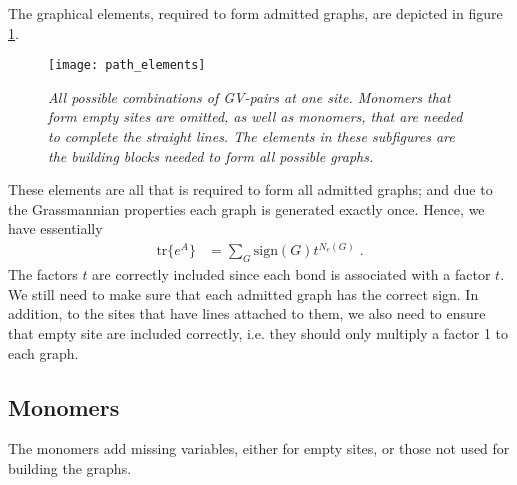 The graphical elements, required to form admitted graphs, are depicted in 
figure \ref{fig:combinations}.
%
\begin{figure}[h]
\begin{center}
\texttt{[image: path\_elements]}
\caption{{\it All possible combinations of GV-pairs at one site. Monomers that form empty sites are omitted, as well as monomers, that are needed to complete the straight lines. The elements in these subfigures are the building blocks needed   to form all possible graphs.}\label{fig:combinations}}
\end{center}
\end{figure}
%
These elements are all that is required to form all admitted graphs; and due to the 
Grassmannian properties each graph is generated exactly once. Hence, we have essentially
%
\begin{align*}
\text{tr}\bigg\{ e^{A} \bigg\} &= \sum_{G} \text{sign}(G) t^{N_{e}(G)}\;.
\end{align*}
%
The  factors $t$ are correctly included since each bond is associated with a factor $t$.
We still need to make sure that each admitted graph has the correct sign.
In addition, to the sites that have lines attached to them,
we also need to ensure that empty site are included correctly, i.e. they should only multiply
a factor 1 to each graph.

\subsection{Monomers}
 
The monomers add missing variables, either for empty sites, or those not used  for building the graphs. 

